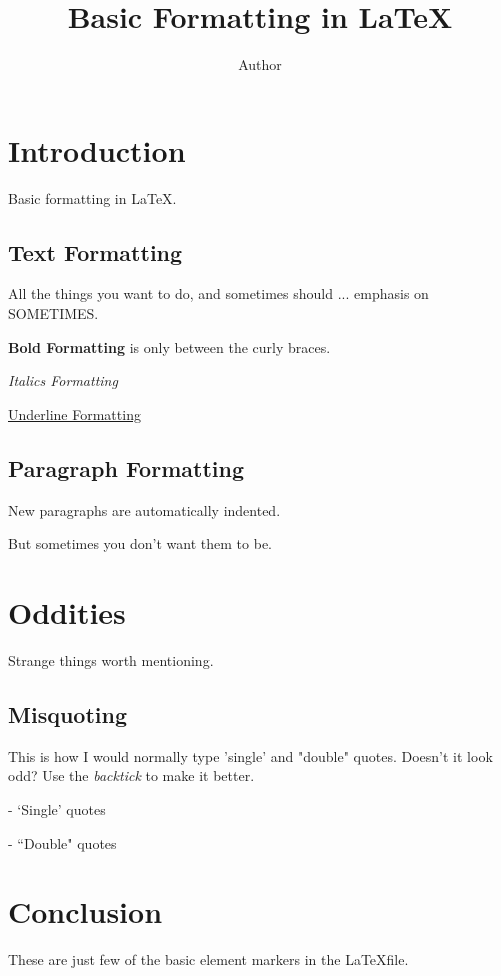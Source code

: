 \documentclass{article}
\title{Basic Formatting in \LaTeX }
\author{Author}
\date{}
\begin{document}
    \maketitle

    \section{Introduction}
        Basic formatting in \LaTeX.

        \subsection{Text Formatting}
            All the things you want to do, and sometimes should ... emphasis on SOMETIMES.

            \textbf{Bold Formatting} is only between the curly braces.

            \emph{Italics Formatting}

            \underline{Underline Formatting}

        \subsection{Paragraph Formatting}

            New paragraphs are automatically indented.

            \noindent But sometimes you don't want them to be.

    \section{Oddities}

        Strange things worth mentioning.

        \subsection{Misquoting}

        This is how I would normally type 'single' and "double" quotes. Doesn't it look odd?
        Use the \emph{backtick} to make it better.

        - `Single' quotes

        - ``Double" quotes

    \section{Conclusion}

        These are just few of the basic element markers in the \LaTeX file.
\end{document}
